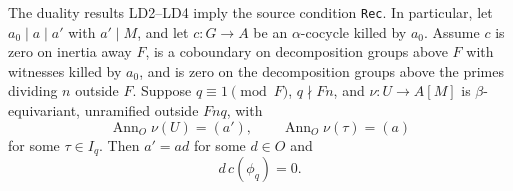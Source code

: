 \begin{proposition}
The duality results LD2--LD4 imply the source condition
\texttt{Rec}.  In particular, let $a_0\mid a\mid a'$ with
$a'\mid M$, and let $c:G\to A$ be an $\alpha$-cocycle killed by
$a_0$.  Assume $c$ is zero on inertia away $F$, is a coboundary
on decomposition groups above $F$ with witnesses killed by $a_0$,
and is zero on the decomposition groups above the primes dividing
$n$ outside $F$.
Suppose $q\equiv1\pmod F$, $q\nmid Fn$, and
$\nu:U\to A[M]$ is $\beta$-equivariant, unramified outside $Fnq$,
with
\[
 \operatorname{Ann}_O\nu(U)=(a'),\qquad
                  \operatorname{Ann}_O\nu(\tau)=(a)
 \tag{OS.22}
\]
for some $\tau\in I_q$.
Then $a'=a d$ for some $d\in O$ and
\[
                         d\,c(\phi_q)=0.
 \tag{OS.23}
\]
\end{proposition}

